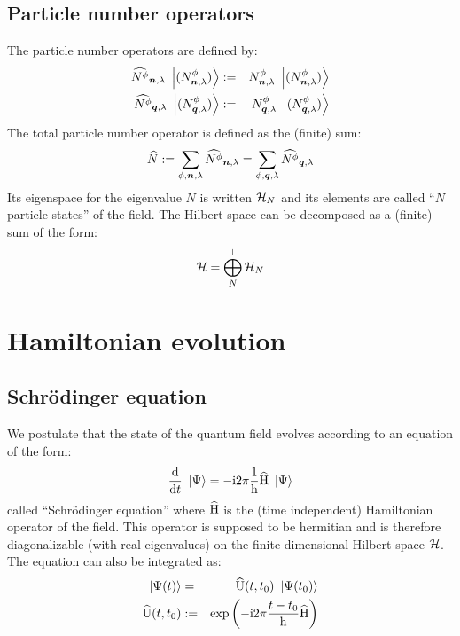 \documentclass[10pt,a4paper,twoside,openany]{book}
\begin{document}
\section{Particle number operators}

The particle number operators are defined by:
\begin{eqnarray*}
\widehat{N^{\phi}}_{{\boldsymbol{n}}, {\lambda}} \ \left|{({N}^{\phi}_{{\boldsymbol{n}}, {\lambda}})}\right\rangle & := & {N}^{\phi}_{{\boldsymbol{n}}, {\lambda}} \ \left|{({N}^{\phi}_{{\boldsymbol{n}}, {\lambda}})}\right\rangle \\
\widehat{N^{\phi}}_{{\boldsymbol{q}}, {\lambda}} \ \left|{({N}^{\phi}_{{\boldsymbol{q}}, {\lambda}})}\right\rangle & := & {N}^{\phi}_{{\boldsymbol{q}}, {\lambda}} \ \left|{({N}^{\phi}_{{\boldsymbol{q}}, {\lambda}})}\right\rangle
\end{eqnarray*}
The total particle number operator is defined as the (finite) sum:
\begin{equation*}
\widehat{N} := \sum_{\phi,\boldsymbol{n},\lambda} \widehat{N^{\phi}}_{{\boldsymbol{n}}, {\lambda}} = \sum_{\phi,\boldsymbol{q},\lambda} \widehat{N^{\phi}}_{{\boldsymbol{q}}, {\lambda}}
\end{equation*}
Its eigenspace for the eigenvalue $N$ is written $\mathcal H_{N}$ and its elements are called ``$N$ particle states'' of the field. The Hilbert space can be decomposed as a (finite) sum of the form:
\begin{equation*}
\mathcal H = \bigoplus_{N}^\perp \mathcal H_{N}
\end{equation*}

\chapter{Hamiltonian evolution}
\label{Hamiltonian evolution}

\section{Schrödinger equation}
\label{Schrödinger equation}

We postulate that the state of the quantum field evolves according to an equation of the form:
\begin{equation*}
\frac{\mathrm d}{\mathrm dt} \ \left|{\Psi}\right\rangle = -\mathrm{i} 2 \pi \frac 1 {\mathrm h} \widehat{\mathrm H} \ \left|{\Psi}\right\rangle
\end{equation*}
called ``Schrödinger equation'' where $\widehat{\mathrm H}$ is the (time independent) Hamiltonian operator of the field. This operator is supposed to be hermitian and is therefore diagonalizable (with real eigenvalues) on the finite dimensional Hilbert space $\mathcal H$. The equation can also be integrated as:
\begin{eqnarray*}
\ \left|{\Psi(t)}\right\rangle & = & \widehat{\mathrm U}({t},{t_0}) \ \left|{\Psi(t_0)}\right\rangle \\
\widehat{\mathrm U}({t},{t_0}) & := & \mathrm{exp} \left( {- \mathrm{i} 2 \pi \frac{t - t_0} {\mathrm h} \widehat{\mathrm H}} \right)
\end{eqnarray*}
\end{document}

